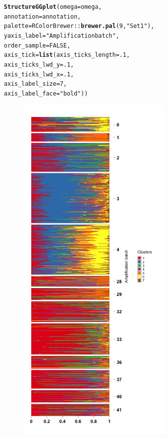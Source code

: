 \documentclass[12pt]{article}\usepackage[]{graphicx}\usepackage[usenames,dvipsnames]{color}
\makeatletter
\newcommand{\hlnum}[1]{\textcolor[rgb]{0.686,0.059,0.569}{#1}}%
\newcommand{\hlstr}[1]{\textcolor[rgb]{0.192,0.494,0.8}{#1}}%
\newcommand{\hlopt}[1]{\textcolor[rgb]{0,0,0}{#1}}%
\newcommand{\hlstd}[1]{\textcolor[rgb]{0.345,0.345,0.345}{#1}}%
\newcommand{\hlkwc}[1]{\textcolor[rgb]{0.333,0.667,0.333}{#1}}%
\newcommand{\hlkwd}[1]{\textcolor[rgb]{0.737,0.353,0.396}{\textbf{#1}}}%
\newenvironment{kframe}{%
 \def\at@end@of@kframe{}%
 \ifinner\ifhmode%
  \def\at@end@of@kframe{\end{minipage}}%
  \begin{minipage}{\columnwidth}%
 \fi\fi%
 \def\FrameCommand##1{\hskip\@totalleftmargin \hskip-\fboxsep
 \colorbox{shadecolor}{##1}\hskip-\fboxsep
     \hskip-\linewidth \hskip-\@totalleftmargin \hskip\columnwidth}%
 \MakeFramed {\advance\hsize-\width
   \@totalleftmargin\z@ \linewidth\hsize
   \@setminipage}}%
 {\par\unskip\endMakeFramed%
 \at@end@of@kframe}
\newenvironment{knitrout}{}{} %
\makeatother
\begin{document}
\begin{knitrout}
\color{fgcolor}\begin{kframe}
\begin{alltt}
\hlkwd{StructureGGplot}\hlstd{(}\hlkwc{omega} \hlstd{= omega,}
                \hlkwc{annotation} \hlstd{= annotation,}
                \hlkwc{palette} \hlstd{= RColorBrewer}\hlopt{::}\hlkwd{brewer.pal}\hlstd{(}\hlnum{9}\hlstd{,} \hlstr{"Set1"}\hlstd{),}
                \hlkwc{yaxis_label} \hlstd{=} \hlstr{"Amplification batch"}\hlstd{,}
                \hlkwc{order_sample} \hlstd{=} \hlnum{FALSE}\hlstd{,}
                \hlkwc{axis_tick} \hlstd{=} \hlkwd{list}\hlstd{(}\hlkwc{axis_ticks_length} \hlstd{=} \hlnum{.1}\hlstd{,}
                                 \hlkwc{axis_ticks_lwd_y} \hlstd{=} \hlnum{.1}\hlstd{,}
                                 \hlkwc{axis_ticks_lwd_x} \hlstd{=} \hlnum{.1}\hlstd{,}
                                 \hlkwc{axis_label_size} \hlstd{=} \hlnum{7}\hlstd{,}
                                 \hlkwc{axis_label_face} \hlstd{=} \hlstr{"bold"}\hlstd{))}
\end{alltt}
\end{kframe}
\end{knitrout}

\begin{figure}[htp]
\begin{center}
\includegraphics[width=3in,height=7in]{figure/plot_topic_2-1}
\end{center}
\end{figure}
\end{document}
